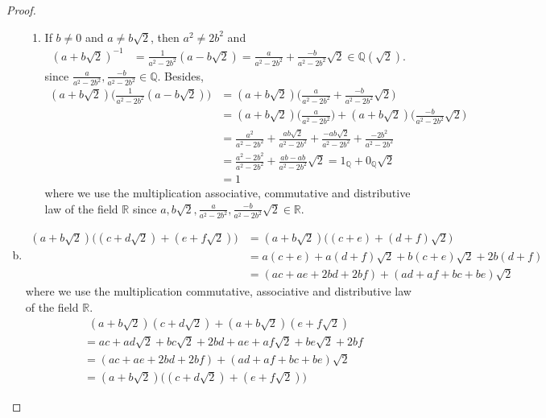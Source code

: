 \documentclass{amsart}
\newcommand{\bbr}{\mathbb{R}}
\newcommand{\bbq}{\mathbb{Q}}
\theoremstyle{plain}
\theoremstyle{definition}
\begin{document}
\begin{proof}
\begin{enumerate}[(a)]
\begin{enumerate}[(1)]
				    \item If $b \neq 0 $ and $ a \neq b\sqrt 2$, then $a^2 \neq 2b^2$ and    
				    \begin{align*}
						(a+b\sqrt 2)^{-1} &= \frac{1}{a^2-2b^2}(a-b\sqrt 2) = \frac{a}{a^2-2b^2}+\frac{-b}{a^2-2b^2}\sqrt 2 \in \bbq(\sqrt 2).
					\end{align*}
					since $\frac{a}{a^2-2b^2}, \frac{-b}{a^2-2b^2} \in \bbq$. Besides,\\
						\begin{align*}
							(a+b\sqrt 2)\Big( \frac{1}{a^2-2b^2}(a-b\sqrt 2)\Big) &= (a+b\sqrt 2)\Big(\frac{a}{a^2-2b^2}+\frac{-b}{a^2-2b^2}\sqrt 2 \Big) \\&= (a+b\sqrt 2)\Big(\frac{a}{a^2-2b^2}\Big) + (a+b\sqrt 2)\Big(\frac{-b}{a^2-2b^2}\sqrt 2\Big) \\&=  \frac{a^2}{a^2-2b^2}+\frac{ab\sqrt 2}{a^2-2b^2}+ \frac{-ab\sqrt 2}{a^2-2b^2}+\frac{-2b^2}{a^2-2b^2} \\&= \frac{a^2-2b^2}{a^2-2b^2}+\frac{ab-ab}{a^2-2b^2}\sqrt 2=1_{\bbq}+0_{\bbq}\sqrt 2 \\&= 1
					\end{align*}
		      		where we use the multiplication associative, commutative and distributive law of the field $\bbr$ since $a,b\sqrt 2, \frac{a}{a^2-2b^2}, \frac{-b}{a^2-2b^2}\sqrt 2 \in \bbr$.\\ 
			\end{enumerate}
		\item 
			\begin{align*}
				(a+b\sqrt 2)\Big((c+d\sqrt 2) + (e+f\sqrt 2)\Big) &= (a+b\sqrt 2)\Big((c+e)+(d+f)\sqrt 2\Big) \\ &= a(c+e)+a(d+f)\sqrt 2 + b(c+e)\sqrt 2 + 2b(d+f) \\ &= (ac+ae+2bd+2bf) + (ad+af+bc+be)\sqrt 2
				\end{align*}
		    where we use the multiplication commutative, associative and  distributive law of the field $\bbr$.\\
		    \begin{align*}
				(a+b\sqrt 2)(c+d\sqrt 2) +  (a+b\sqrt 2)(e+f\sqrt 2)
			\end{align*}
			\begin{align*}
				 &= ac+ad\sqrt 2 + bc \sqrt 2 + 2bd + ae + af\sqrt 2 + be\sqrt 2 + 2bf \\
				 &= (ac+ae+2bd+2bf) + (ad+af+bc+be)\sqrt 2 \\
				&= (a+b\sqrt 2)\Big((c+d\sqrt 2) + (e+f\sqrt 2)\Big) 
			\end{align*}

\end{enumerate}
\end{proof}
\end{document}
